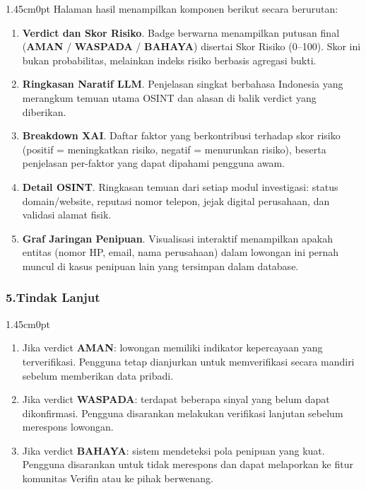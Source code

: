 \documentclass[12pt,a4paper]{article}
\begin{document}
\begin{adjustwidth}{1.45cm}{0pt}
\hspace*{0.85cm}Halaman hasil menampilkan komponen berikut secara berurutan:

\begin{enumerate}[label=\textbf{\alph*.}, labelindent=0pt, leftmargin=*]
  \item \textbf{Verdict dan Skor Risiko}. Badge berwarna menampilkan putusan final (\textbf{AMAN} / \textbf{WASPADA} / \textbf{BAHAYA}) disertai Skor Risiko (0--100). Skor ini bukan probabilitas, melainkan indeks risiko berbasis agregasi bukti.
  \item \textbf{Ringkasan Naratif LLM}. Penjelasan singkat berbahasa Indonesia yang merangkum temuan utama OSINT dan alasan di balik verdict yang diberikan.
  \item \textbf{Breakdown XAI}. Daftar faktor yang berkontribusi terhadap skor risiko (positif = meningkatkan risiko, negatif = menurunkan risiko), beserta penjelasan per-faktor yang dapat dipahami pengguna awam.
  \item \textbf{Detail OSINT}. Ringkasan temuan dari setiap modul investigasi: status domain/website, reputasi nomor telepon, jejak digital perusahaan, dan validasi alamat fisik.
  \item \textbf{Graf Jaringan Penipuan}. Visualisasi interaktif menampilkan apakah entitas (nomor HP, email, nama perusahaan) dalam lowongan ini pernah muncul di kasus penipuan lain yang tersimpan dalam database.
\end{enumerate}
\end{adjustwidth}

\subsubsection*{5.\quad Tindak Lanjut}

\begin{adjustwidth}{1.45cm}{0pt}
\begin{enumerate}[label=\textbf{\alph*.}, labelindent=0pt, leftmargin=*]
  \item Jika verdict \textbf{AMAN}: lowongan memiliki indikator kepercayaan yang terverifikasi. Pengguna tetap dianjurkan untuk memverifikasi secara mandiri sebelum memberikan data pribadi.
  \item Jika verdict \textbf{WASPADA}: terdapat beberapa sinyal yang belum dapat dikonfirmasi. Pengguna disarankan melakukan verifikasi lanjutan sebelum merespons lowongan.
  \item Jika verdict \textbf{BAHAYA}: sistem mendeteksi pola penipuan yang kuat. Pengguna disarankan untuk tidak merespons dan dapat melaporkan ke fitur komunitas Verifin atau ke pihak berwenang.
\end{enumerate}
\end{adjustwidth}
\end{document}
